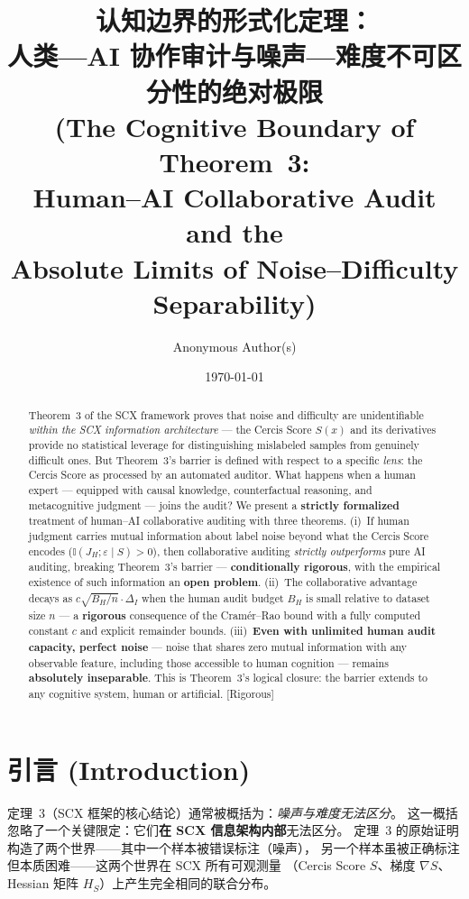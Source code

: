 \documentclass[12pt,a4paper]{article}
\title{\bfseries 认知边界的形式化定理：\\
人类—AI 协作审计与噪声—难度不可区分性的绝对极限\\
(The Cognitive Boundary of Theorem~3:\\
Human--AI Collaborative Audit and the\\
Absolute Limits of Noise--Difficulty Separability)}
\author{Anonymous Author(s)}
\date{\today}
\newcommand{\rigorous}{\textcolor{green!50!black}{\small\textsf{[Rigorous]}}}
\newcommand{\I}{\mathbb{I}}
\begin{document}
\maketitle

\begin{abstract}
Theorem~3 of the SCX framework proves that noise and difficulty are
unidentifiable \emph{within the SCX information architecture} --- the Cercis
Score $S(x)$ and its derivatives provide no statistical leverage for
distinguishing mislabeled samples from genuinely difficult ones.  But
Theorem~3's barrier is defined with respect to a specific \emph{lens}: the
Cercis Score as processed by an automated auditor.  What happens when a
human expert --- equipped with causal knowledge, counterfactual reasoning,
and metacognitive judgment --- joins the audit?  We present a \textbf{strictly
formalized} treatment of human--AI collaborative auditing with three
theorems.  (i)~If human judgment carries mutual information about label noise
beyond what the Cercis Score encodes ($\I(J_H; \varepsilon \mid S) > 0$),
then collaborative auditing \emph{strictly outperforms} pure AI auditing,
breaking Theorem~3's barrier --- \textbf{conditionally rigorous}, with the
empirical existence of such information an \textbf{open problem}.
(ii)~The collaborative advantage decays as $c\sqrt{B_H/n} \cdot \Delta_I$
when the human audit budget $B_H$ is small relative to dataset size $n$ ---
a \textbf{rigorous} consequence of the Cram\'er--Rao bound with a fully
computed constant $c$ and explicit remainder bounds.
(iii)~\textbf{Even with unlimited human audit capacity, perfect noise} ---
noise that shares zero mutual information with any observable feature,
including those accessible to human cognition --- remains \textbf{absolutely
inseparable}.  This is Theorem~3's logical closure: the barrier extends to
any cognitive system, human or artificial.  \rigorous
\end{abstract}

\section{引言 (Introduction)}

定理~3（SCX 框架的核心结论）通常被概括为：\textit{噪声与难度无法区分}。
这一概括忽略了一个关键限定：它们\textbf{在 SCX 信息架构内部}无法区分。
定理~3 的原始证明构造了两个世界——其中一个样本被错误标注（噪声），
另一个样本虽被正确标注但本质困难——这两个世界在 SCX 所有可观测量
（Cercis Score $S$、梯度 $\nabla S$、Hessian 矩阵 $H_S$）上产生完全相同的联合分布。
\end{document}
